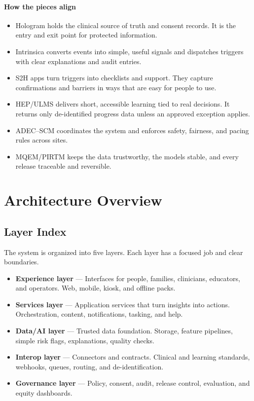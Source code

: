 \documentclass[12pt]{article}
\begin{document}
\paragraph{How the pieces align}
\begin{itemize}[leftmargin=*]
  \item Hologram holds the clinical source of truth and consent records. It is the entry and exit point for protected information.
  \item Intrinsica converts events into simple, useful signals and dispatches triggers with clear explanations and audit entries.
  \item S2H apps turn triggers into checklists and support. They capture confirmations and barriers in ways that are easy for people to use.
  \item HEP/ULMS delivers short, accessible learning tied to real decisions. It returns only de-identified progress data unless an approved exception applies.
  \item ADEC–SCM coordinates the system and enforces safety, fairness, and pacing rules across sites.
  \item MQEM/PIRTM keeps the data trustworthy, the models stable, and every release traceable and reversible.
\end{itemize}



\section{Architecture Overview}

\subsection*{Layer Index}
The system is organized into five layers. Each layer has a focused job and clear boundaries.

\begin{itemize}[leftmargin=*]
  \item \textbf{Experience layer} — Interfaces for people, families, clinicians, educators, and operators. Web, mobile, kiosk, and offline packs.
  \item \textbf{Services layer} — Application services that turn insights into actions. Orchestration, content, notifications, tasking, and help.
  \item \textbf{Data/AI layer} — Trusted data foundation. Storage, feature pipelines, simple risk flags, explanations, quality checks.
  \item \textbf{Interop layer} — Connectors and contracts. Clinical and learning standards, webhooks, queues, routing, and de-identification.
  \item \textbf{Governance layer} — Policy, consent, audit, release control, evaluation, and equity dashboards.
\end{itemize}
\end{document}
